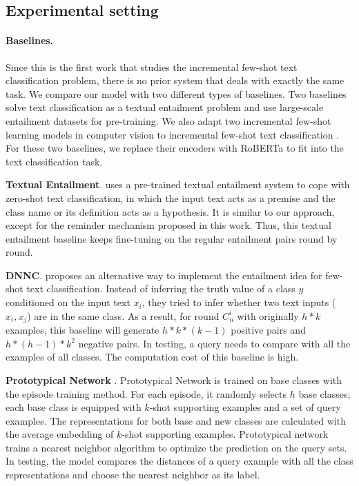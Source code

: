 \documentclass[11pt]{article}
\begin{document}
\subsection{Experimental setting}


\paragraph{Baselines.} 
Since this is the first work that studies the incremental few-shot text classification problem, there is no prior system that deals with exactly the same task.
We compare our model with two different types of baselines. Two baselines \cite{DBLPYinHR19, zhangdiscriminative} solve text classification as a textual entailment problem and use large-scale entailment datasets for pre-training.
We also adapt two incremental few-shot learning models in computer vision to incremental few-shot text classification \cite{DBLPSnellSZ17, DBLPGidarisK18}. For these two baselines, we replace their encoders with RoBERTa to fit into the text classification task.

\textbullet\enspace \textbf{Textual Entailment}.  uses a pre-trained textual entailment system to cope with zero-shot text classification, in which the input text acts as a premise and the class name or its definition acts as a hypothesis. It is similar to our approach, except for the reminder mechanism proposed in this work. Thus, this textual entailment baseline keeps fine-tuning on the regular entailment pairs round by round. 
    
\textbullet\enspace \textbf{DNNC}.  proposes an alternative way to implement the entailment idea for few-shot text classification. Instead of inferring the truth value of a class $y$ conditioned on the input text $x_i$, they tried to infer whether two text inputs ($x_i, x_j$) are in the same class.
As a result, for round $C_n^i$ with originally $h*k$ examples, this baseline will generate $h*k*(k-1)$ positive pairs and $h*(h-1)*k^2$ negative pairs. In testing, a query needs to compare with all the examples of all classes. The computation cost of this baseline is high.


\textbullet\enspace \textbf{Prototypical Network} \cite{DBLPSnellSZ17}. Prototypical Network is trained on base classes with the episode training method. For each episode, it randomly selects $h$ base classes; each base class is equipped with $k$-shot supporting examples and a set of query examples.
The representations for both base and new classes are calculated with the average embedding of $k$-shot supporting examples. Prototypical network trains a nearest neighbor algorithm to optimize the prediction on the query sets. In testing, the model compares the distances of a query example with all the class representations and choose the nearest neighbor as its label. 
\end{document}
